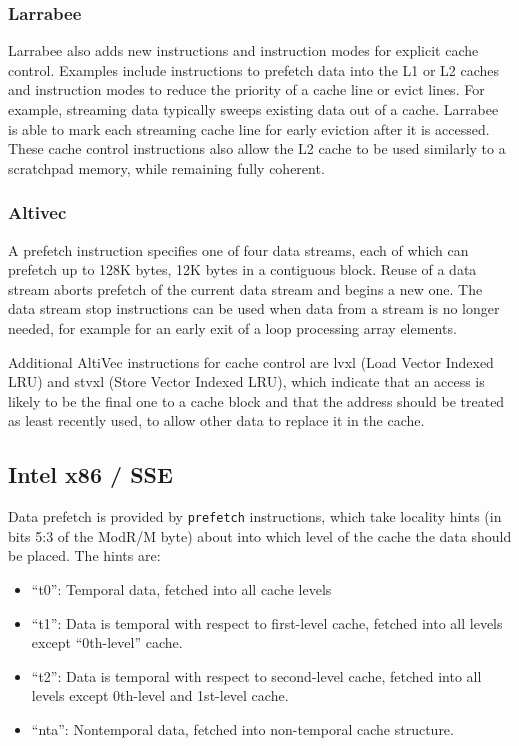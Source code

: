 \subsubsection{Larrabee}
Larrabee also adds new instructions and instruction modes for explicit cache control. Examples include instructions to prefetch data into the L1 or L2 caches and instruction modes to reduce the priority of a cache line or evict lines. For example, streaming data typically sweeps existing data out of a cache. Larrabee is able to mark each streaming cache line for early eviction after it is accessed. These cache control instructions also allow the L2 cache to be used similarly to a scratchpad memory, while remaining fully coherent.

\subsubsection{Altivec}
A prefetch instruction specifies one of four data streams, each of which can prefetch up to 128K bytes, 12K bytes in a contiguous block. Reuse of a data stream aborts prefetch of the current data stream and begins a new one. The data stream stop instructions can be used when data from a stream is no longer needed, for example for an early exit of a loop processing array elements.

Additional AltiVec instructions for cache control are lvxl (Load Vector Indexed LRU) and stvxl (Store Vector Indexed LRU), which indicate that an access is likely to be the final one to a cache block and that the address should be treated as least recently used, to allow other data to replace it in the cache.

\subsection{Intel x86 / SSE}

Data prefetch is provided by \verb=prefetch= instructions, which take locality hints (in bits 5:3 of the ModR/M byte) about into which level of the cache the data should be placed. The hints are:
\begin{itemize}
\item ``t0'': Temporal data, fetched into all cache levels
\item ``t1'': Data is temporal with respect to first-level cache, fetched into all levels except ``0th-level'' cache.
\item ``t2'': Data is temporal with respect to second-level cache, fetched into all levels except 0th-level and 1st-level cache.
\item ``nta'': Nontemporal data, fetched into non-temporal cache structure.
\end{itemize}

